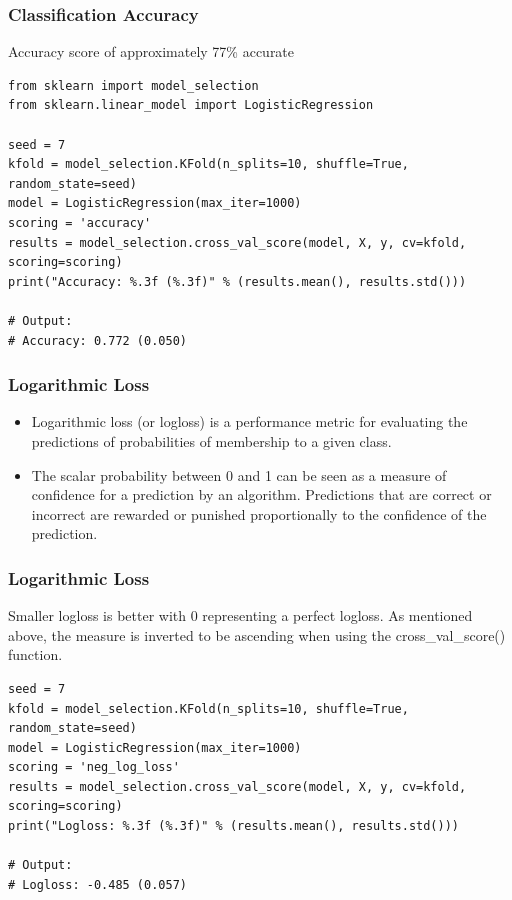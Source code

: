 \begin{frame}[fragile]\frametitle{Classification Accuracy}
Accuracy score of approximately 77\% accurate
\begin{lstlisting}
from sklearn import model_selection
from sklearn.linear_model import LogisticRegression

seed = 7
kfold = model_selection.KFold(n_splits=10, shuffle=True, random_state=seed)
model = LogisticRegression(max_iter=1000)
scoring = 'accuracy'
results = model_selection.cross_val_score(model, X, y, cv=kfold, scoring=scoring)
print("Accuracy: %.3f (%.3f)" % (results.mean(), results.std()))

# Output:
# Accuracy: 0.772 (0.050)
\end{lstlisting}
\end{frame}



\begin{frame}[fragile]\frametitle{Logarithmic Loss}

	\begin{itemize}
	\item Logarithmic loss (or logloss) is a performance metric for evaluating the predictions of probabilities of membership to a given class.
	\item The scalar probability between 0 and 1 can be seen as a measure of confidence for a prediction by an algorithm. Predictions that are correct or incorrect are rewarded or punished proportionally to the confidence of the prediction.
	\end{itemize}
	
\end{frame}

\begin{frame}[fragile]\frametitle{Logarithmic Loss}
Smaller logloss is better with 0 representing a perfect logloss. As mentioned above, the measure is inverted to be ascending when using the cross\_val\_score() function.
\begin{lstlisting}
seed = 7
kfold = model_selection.KFold(n_splits=10, shuffle=True, random_state=seed)
model = LogisticRegression(max_iter=1000)
scoring = 'neg_log_loss'
results = model_selection.cross_val_score(model, X, y, cv=kfold, scoring=scoring)
print("Logloss: %.3f (%.3f)" % (results.mean(), results.std()))

# Output:
# Logloss: -0.485 (0.057)
\end{lstlisting}
\end{frame}




